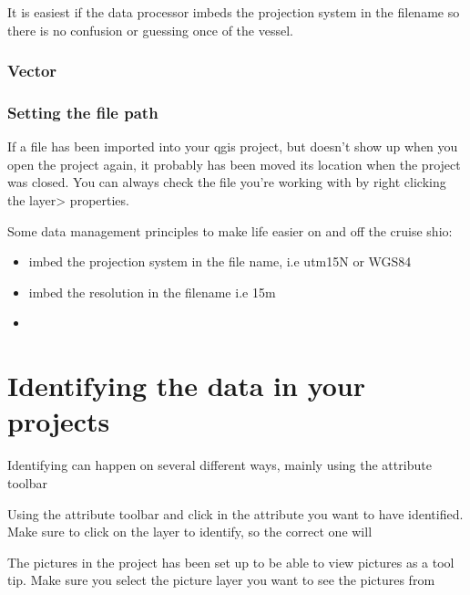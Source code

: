 \documentclass[letterpaper,10pt,english]{sphinxmanual}
\begin{document}
\sphinxAtStartPar
It is easiest if the data processor imbeds the projection system in the filename so there is no confusion or guessing once of the vessel.


\subsection{Vector}
\label{\detokenize{03_data_ingest:vector}}

\subsection{Setting the file path}
\label{\detokenize{03_data_ingest:setting-the-file-path}}
\sphinxAtStartPar
If a file has been imported into your qgis project, but doesn’t show up when you open the project again, it probably has been moved its location when the project was closed. You can always check the file you’re working with by right clicking the layer\sphinxhyphen{}\textgreater{} properties.

\sphinxAtStartPar
Some data management principles to make life easier on and off the cruise shio:
\begin{itemize}
\item {} 
\sphinxAtStartPar
imbed the projection system in the file name, i.e utm15N or WGS84

\item {} 
\sphinxAtStartPar
imbed the resolution in the filename i.e 15m

\item {} 
\end{itemize}


\chapter{Identifying the data in your projects}
\label{\detokenize{04_data_search:identifying-the-data-in-your-projects}}\label{\detokenize{04_data_search::doc}}
\sphinxAtStartPar
Identifying can happen on several different ways, mainly using the attribute toolbar



\sphinxAtStartPar
Using the attribute toolbar and click in the attribute you want to have identified. Make sure to click on the layer to identify, so the correct one will

\sphinxAtStartPar
The pictures in the project has been set up to be able to view pictures as a tool tip. Make sure you select the picture layer you want to see the pictures from
\end{document}
